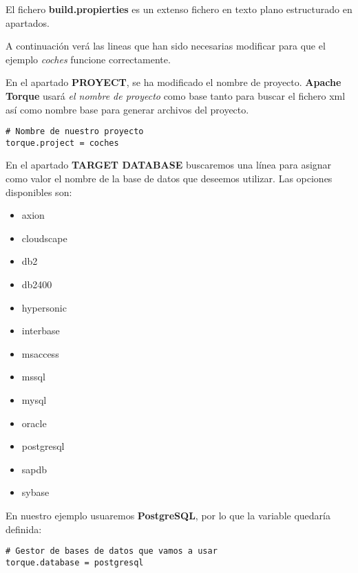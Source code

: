 El fichero {\bf build.propierties} es un extenso fichero en texto plano estructurado en apartados.

A continuación verá las lineas que han sido necesarias modificar para que el ejemplo {\em coches} funcione correctamente.

En el apartado {\bf PROYECT}, se ha modificado el nombre de proyecto. {\bf Apache Torque} usará {\em el nombre de proyecto} como base tanto para buscar el fichero xml así como nombre base para generar archivos del proyecto.
\begin{lstlisting}
# Nombre de nuestro proyecto
torque.project = coches
\end{lstlisting}

En el apartado {\bf TARGET DATABASE} buscaremos una línea para asignar como valor el nombre de la base de datos que deseemos utilizar. Las opciones disponibles son:

\begin{multicols}{2}
\begin{itemize}
	\item axion
	\item cloudscape
	\item db2
	\item db2400
	\item hypersonic
	\item interbase
	\item msaccess
	\item mssql
	\item mysql
	\item oracle
	\item postgresql
	\item sapdb
	\item sybase
\end{itemize}
\end{multicols}

En nuestro ejemplo usuaremos {\bf PostgreSQL}, por lo que la variable quedaría definida:
\begin{lstlisting}
# Gestor de bases de datos que vamos a usar
torque.database = postgresql
\end{lstlisting}

